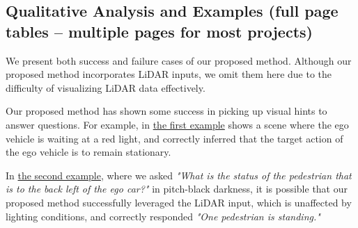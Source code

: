 \documentclass{article} %
\begin{document}
\clearpage
\subsection{Qualitative Analysis and Examples (full page tables -- multiple pages for most projects)}
We present both success and failure cases of our proposed method. Although our proposed method incorporates LiDAR inputs, we omit them here due to the difficulty of visualizing LiDAR data effectively.

Our proposed method has shown some success in picking up visual hints to answer questions. For example, in \hyperlink{example1}{the first example} shows a scene where the ego vehicle is waiting at a red light, and correctly inferred that the target action of the ego vehicle is to remain stationary.

In \hyperlink{example2}{the second example}, where we asked \textit{"What is the status of the pedestrian that is to the back left of the ego car?"} in pitch-black darkness, it is possible that our proposed method successfully leveraged the LiDAR input, which is unaffected by lighting conditions, and correctly responded \textit{"One pedestrian is standing."}
\end{document}
